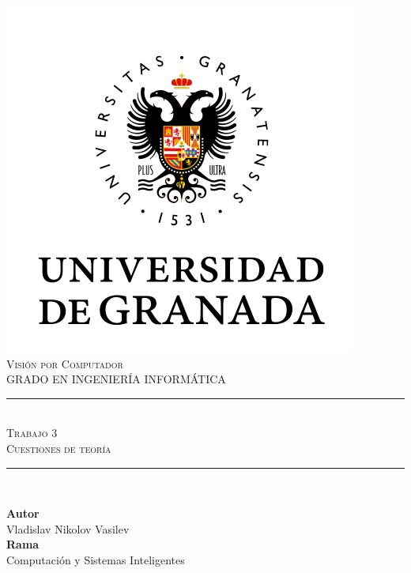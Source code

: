 \documentclass[11pt,a4paper]{article}
\newcommand{\asignatura}{Visión por Computador}
\newcommand{\autor}{Vladislav Nikolov Vasilev}
\newcommand{\titulo}{Trabajo 3}
\newcommand{\subtitulo}{Cuestiones de teoría}
\begin{document}

\begin{titlepage}

\begin{minipage}{\textwidth}

\centering

\includegraphics[scale=0.5]{img/ugr.png}\\

\textsc{\Large \asignatura{}\\[0.2cm]}
\textsc{GRADO EN INGENIERÍA INFORMÁTICA}\\[1cm]

\noindent\rule[-1ex]{\textwidth}{1pt}\\[1.5ex]
\textsc{{\Huge \titulo\\[0.5ex]}}
\textsc{{\Large \subtitulo\\}}
\noindent\rule[-1ex]{\textwidth}{2pt}\\[3.5ex]

\end{minipage}

\vspace{0.5cm}

\begin{minipage}{\textwidth}

\centering

\textbf{Autor}\\ {\autor{}}\\[2.5ex]
\textbf{Rama}\\ {Computación y Sistemas Inteligentes}\\[2.5ex]
\vspace{0.3cm}


\end{minipage}
\end{titlepage}
\end{document}
